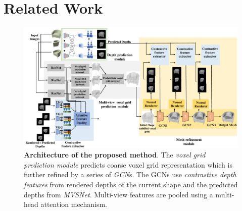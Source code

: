 \section{Related Work}

\begin{figure}[t]
\begin{center}
\includegraphics[width=\linewidth]{imgs/meshrcnn_architecture.pdf}
\end{center}
\vspace{-4mm}
    \caption{\textbf{Architecture of the proposed method}. The \emph{voxel grid prediction module} predicts coarse voxel grid representation which is further refined by a series of \emph{GCN}s. The GCNs use \emph{contrastive depth features} from rendered depths of the current shape and the predicted depths from \emph{MVSNet}. Multi-view features are pooled using a multi-head attention mechanism.}
\vspace{-4mm}
\label{fig:system_architecture}
\end{figure}

